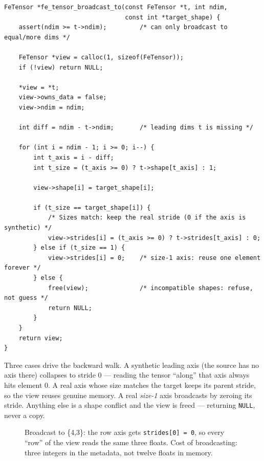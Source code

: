 \documentclass[11pt,a4paper]{article}
\begin{document}
\begin{lstlisting}[style=cstyle,caption={core/tensor.c --- stride-0 broadcasting, back-aligned}]
FeTensor *fe_tensor_broadcast_to(const FeTensor *t, int ndim,
                                 const int *target_shape) {
    assert(ndim >= t->ndim);         /* can only broadcast to equal/more dims */

    FeTensor *view = calloc(1, sizeof(FeTensor));
    if (!view) return NULL;

    *view = *t;
    view->owns_data = false;
    view->ndim = ndim;

    int diff = ndim - t->ndim;       /* leading dims t is missing */

    for (int i = ndim - 1; i >= 0; i--) {
        int t_axis = i - diff;
        int t_size = (t_axis >= 0) ? t->shape[t_axis] : 1;

        view->shape[i] = target_shape[i];

        if (t_size == target_shape[i]) {
            /* Sizes match: keep the real stride (0 if the axis is synthetic) */
            view->strides[i] = (t_axis >= 0) ? t->strides[t_axis] : 0;
        } else if (t_size == 1) {
            view->strides[i] = 0;    /* size-1 axis: reuse one element forever */
        } else {
            free(view);              /* incompatible shapes: refuse, not guess */
            return NULL;
        }
    }
    return view;
}
\end{lstlisting}

Three cases drive the backward walk. A synthetic leading axis (the source has no
axis there) collapses to stride 0 --- reading the tensor ``along'' that axis
always hits element 0. A real axis whose size matches the target keeps its
parent stride, so the view reuses genuine memory. A real \emph{size-1} axis
broadcasts by zeroing its stride. Anything else is a shape conflict and the view
is freed --- returning \texttt{NULL}, never a copy.

\begin{figure}[h]
\centering
{}
\caption{Broadcast to \{4,3\}: the row axis gets \texttt{strides[0] = 0}, so
every ``row'' of the view reads the same three floats. Cost of broadcasting:
three integers in the metadata, not twelve floats in memory.}
\label{fig:bcast}
\end{figure}
\end{document}
